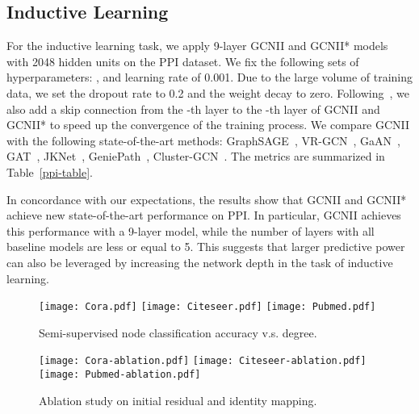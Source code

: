 \documentclass{article}
\begin{document}
\subsection{Inductive Learning}
For the inductive learning task, we apply  9-layer GCNII and GCNII* models with
2048 hidden units on the PPI dataset. We fix the following sets of
hyperparameters: ,  and learning rate of
0.001. Due to the large volume of training data, we set the dropout rate to 0.2
and the weight decay to
zero. Following~\cite{velickovic2018graph},  we also add a skip
connection from the -th layer to the -th layer of
GCNII and GCNII* to speed up the convergence of the training process. 
We compare GCNII with the
following state-of-the-art methods:
GraphSAGE~\cite{hamilton2017inductive},
VR-GCN~\cite{DBLP:conf/icml/ChenZS18},
GaAN~\cite{DBLP:conf/uai/ZhangSXMKY18},
GAT~\cite{velickovic2018graph}, JKNet~\cite{DBLP:conf/icml/XuLTSKJ18},
GeniePath~\cite{DBLP:conf/aaai/LiuCLZLSQ19},
Cluster-GCN~\cite{DBLP:conf/kdd/ChiangLSLBH19}. The metrics are summarized
in Table~\ref{ppi-table}.

In concordance with our expectations, the results show that GCNII and GCNII*
achieve new state-of-the-art performance on PPI. In particular, 
GCNII achieves this performance with a 9-layer model, while the number of
layers with all baseline
models are less or equal to 5. This suggests that larger predictive
power can also be leveraged by increasing the network depth in the
task of inductive learning.
 
\begin{figure*}[!t]
\begin{center}
\texttt{[image: Cora.pdf]}
     \texttt{[image: Citeseer.pdf]}
     \texttt{[image: Pubmed.pdf]}
         \vspace{-2mm}
     \caption{Semi-supervised node classification accuracy v.s. degree.} 
     \label{fig:degree_acc}
\end{center}
    \vskip -0.1in
  \end{figure*}

  \begin{figure*}[!t]
\begin{center}
\texttt{[image: Cora-ablation.pdf]}
        \texttt{[image: Citeseer-ablation.pdf]}
        \texttt{[image: Pubmed-ablation.pdf]}
        \vspace{-2mm}
        \caption{Ablation study on initial residual and identity mapping.} 
        \label{fig:ablation}
\end{center}
    \vskip -0.1in
  \end{figure*}
\end{document}
